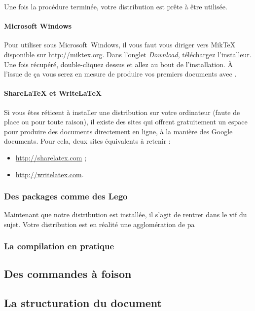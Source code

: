 \documentclass[notitlepage,onecolumn,twoside,12pt,final]{article}
\newcommand{\anglais}[1]{\foreignlanguage{english}{\emph{#1}}}
\begin{document}
					Une fois la procédure terminée, votre distribution \XeLaTeX{} est prête à être utilisée.
				\paragraph{Microsoft Windows}
					Pour utiliser \XeLaTeX{} sous Microsoft~Windows, il vous faut vous diriger vers Mik\TeX{} disponible sur \url{http://miktex.org}. Dans l'onglet \og{}\anglais{Download}\fg{}, téléchargez l'installeur. Une fois récupéré, double-cliquez dessus et allez au bout de l'installation. À l'issue de ça vous serez en mesure de produire vos premiers documents avec \XeLaTeX{}.
				
				\paragraph{Share\LaTeX{} et Write\LaTeX{}}
					Si vous êtes réticent à installer une distribution \XeLaTeX{} sur votre ordinateur (faute de place ou pour toute raison), il existe des sites qui offrent gratuitement un espace pour produire des documents directement en ligne, à la manière des Google documents. Pour cela, deux sites équivalents à retenir :
					\begin{itemize}
						\item \url{http://sharelatex.com} ;
						\item \url{http://writelatex.com}.
					\end{itemize}
					
			\subsubsection{Des packages comme des Lego}\label{subsubsec:paquets}
				Maintenant que notre distribution est installée, il s'agit de rentrer dans le vif du sujet. Votre distribution est en réalité une agglomération de pa
				
			\subsubsection{La compilation en pratique}
		\subsection{Des commandes à foison}
		\subsection{La structuration du document}
\end{document}
